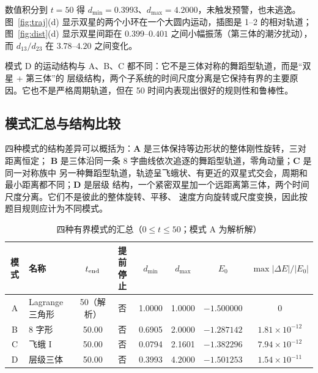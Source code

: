 \documentclass[UTF8,fontset=windows,11pt,a4paper]{ctexart}
\begin{document}
数值积分到 $t=50$ 得 $d_{\min}=0.3993$、$d_{\max}=4.2000$，未触发预警，也未逃逸。
图~\ref{fig:traj}(d) 显示双星的两个小环在一个大圆内运动，插图是 1--2 的相对轨道；
图~\ref{fig:dist}(d) 显示双星间距在 $0.399$--$0.401$ 之间小幅振荡（第三体的潮汐扰动），
而 $d_{13}/d_{23}$ 在 $3.78$--$4.20$ 之间变化。

模式 D 的运动结构与 A、B、C 都不同：它不是三体对称的舞蹈型轨道，而是“双星 + 第三体”的
层级结构，两个子系统的时间尺度分离是它保持有界的主要原因。它也不是严格周期轨道，但在 50
时间内表现出很好的规则性和鲁棒性。

\subsection{模式汇总与结构比较}
四种模式的结构差异可以概括为：\textbf{A} 是三体保持等边形状的整体刚性旋转，三对距离恒定；
\textbf{B} 是三体沿同一条 8 字曲线依次追逐的舞蹈型轨道，零角动量；\textbf{C} 是同一对称族中
另一种舞蹈型轨道，轨迹呈飞蛾状、有更近的双星式交会，周期和最小距离都不同；\textbf{D} 是层级
结构，一个紧密双星加一个远距离第三体，两个时间尺度分离。它们不是彼此的整体旋转、平移、
速度方向旋转或尺度变换，因此按题目规则应计为不同模式。

\begin{table}[H]
\centering\small
\caption{四种有界模式的汇总（$0\le t\le50$；模式 A 为解析解）}
\label{tab:modes}
\begin{tabular}{@{}clcccccc@{}}
\toprule
模式 & 名称 & $t_{\rm end}$ & 提前停止 & $d_{\min}$ & $d_{\max}$ & $E_0$ & $\max|\Delta E|/|E_0|$\\
\midrule
A & Lagrange 三角形 & 50（解析） & 否 & 1.0000 & 1.0000 & $-1.500000$ & 0\\
B & 8 字形 & 50.00 & 否 & 0.6905 & 2.0000 & $-1.287142$ & $1.81\times10^{-12}$\\
C & 飞蛾 I & 50.00 & 否 & 0.0794 & 2.1601 & $-1.382296$ & $7.94\times10^{-12}$\\
D & 层级三体 & 50.00 & 否 & 0.3993 & 4.2000 & $-1.501253$ & $1.54\times10^{-11}$\\
\bottomrule
\end{tabular}
\end{table}
\end{document}
